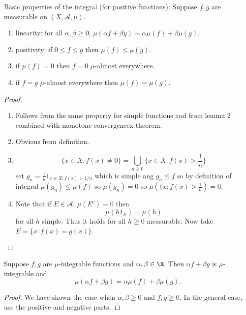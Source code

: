 \documentclass[a4paper]{article}
\begin{document}
\begin{proposition}
  Basic properties of the integral (for positive functions): Suppose \(f, g\) are measurable on \((X, \mathcal A, \mu)\).
  \begin{enumerate}
  \item linearity: for all \(\alpha, \beta \geq 0\), \(\mu(\alpha f + \beta y) = \alpha \mu(f) + \beta \mu(g)\).
  \item positivity: if \(0 \leq f \leq g\) then \(\mu(f) \leq \mu(g)\).
  \item if \(\mu(f) = 0\) then \(f = 0\) \(\mu\)-almost everywhere.
  \item if \(f = g\) \(\mu\)-almost everywhere then \(\mu(f) = \mu(g)\).
  \end{enumerate}
\end{proposition}

\begin{proof}\leavevmode
  \begin{enumerate}
  \item Follows from the same property for simple functions and from lemma 2 combined with monotone convergencex theorem.
  \item Obvious from definition.
  \item
    \[
      \{x \in X: f(x) \neq 0\} = \bigcup_{n \geq 0} \{x \in X: f(x) > \frac{1}{n}\}
    \]
    set \(g_n = \frac{1}{n} 1_{x \in X: f(x) > 1/n}\) which is simple ang \(g_n \leq f\) so by definition of integral \(\mu(g_n) \leq \mu(f)\) so \(\mu(g_n) = 0\) so \(\mu(\{x: f(x) > \frac{1}{n}) = 0\).
  \item Note that if \(E \in \mathcal A\), \(\mu(E^c) = 0\) then
    \[
      \mu(h 1_E) = \mu(h)
    \]
    for all \(h\) simple. Thus it holds for all \(h \geq 0\) measurable. Now take \(E = \{x: f(x) = g(x)\}\).
  \end{enumerate}
\end{proof}

\begin{proposition}
  Suppose \(f, g\) are \(\mu\)-integrable functions and \(\alpha, \beta \in \R\). Then \(\alpha f + \beta g\) is \(\mu\)-integrable and
  \[
    \mu(\alpha f + \beta g) = \alpha \mu(f) + \beta \mu(g).
  \]
\end{proposition}

\begin{proof}
  We have shown the case when \(\alpha, \beta \geq 0\) and \(f, g \geq 0\). In the general case, use the positive and negative parts.
\end{proof}
\end{document}
